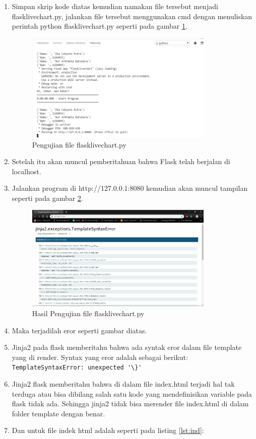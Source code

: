 \begin{enumerate}
\item Simpan skrip kode diatas kemudian namakan file tersebut menjadi flasklivechart.py, jalankan file tersebut menggunakan cmd dengan menuliskan perintah python flasklivechart.py seperti pada gambar \ref{fig:uflc}.
\begin{figure}[!htbp]
	\centerline{\includegraphics[width=0.85\textwidth]{figures/13/uflc.PNG}}
	\caption{Pengujian file flasklivechart.py}
	\label{fig:uflc}
\end{figure}

\item Setelah itu akan muncul pemberitahuan bahwa Flask telah berjalan di localhost.
\item Jalankan program di http://127.0.0.1:8080 kemudian akan muncul tampilan seperti pada gambar \ref{fig:huflc}.
\begin{figure}[!htbp]
	\centerline{\includegraphics[width=0.85\textwidth]{figures/13/huflc.PNG}}
	\caption{Hasil Pengujian file flasklivechart.py}
	\label{fig:huflc}
\end{figure} 

\item Maka terjadilah eror seperti gambar diatas.
\item Jinja2 pada flask memberitahu bahwa ada syntak eror dalam file template yang di render. Syntax yang eror adalah sebagai berikut:
\verb|TemplateSyntaxError: unexpected '\}'|
\item Jinja2 flask memberitahu bahwa di dalam file index.html terjadi hal tak terduga atau bisa dibilang salah satu kode yang mendefinisikan variable pada flask tidak ada. Sehingga jinja2 tidak bisa merender file index.html di dalam folder template dengan benar.
\item Dan untuk file indek html adalah seperti pada listing \ref{lst:ind}:



\end{enumerate}

